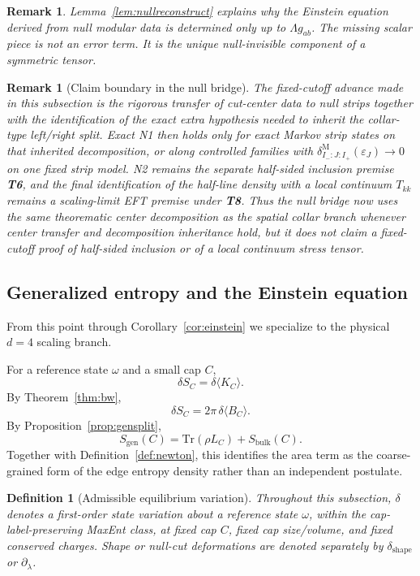 \documentclass[11pt]{article}
\newtheorem{definition}[theorem]{Definition}
\newtheorem{remark}[theorem]{Remark}
\begin{document}
\begin{remark}
Lemma~\ref{lem:nullreconstruct} explains why the Einstein equation derived from null modular data is determined only up to \(\Lambda g_{ab}\). The missing scalar piece is not an error term. It is the unique null-invisible component of a symmetric tensor.
\end{remark}

\begin{remark}[Claim boundary in the null bridge]
The fixed-cutoff advance made in this subsection is the rigorous transfer of cut-center data to null strips together with the identification of the exact extra hypothesis needed to inherit the collar-type left/right split. Exact N1 then holds only for exact Markov strip states on that inherited decomposition, or along controlled families with \(\delta^{\mathrm M}_{I_-:J:I_+}(\varepsilon_J)\to 0\) on one fixed strip model. N2 remains the separate half-sided inclusion premise \textbf{T6}, and the final identification of the half-line density with a local continuum \(T_{kk}\) remains a scaling-limit EFT premise under \textbf{T8}. Thus the null bridge now uses the same theorematic center decomposition as the spatial collar branch whenever center transfer and decomposition inheritance hold, but it does not claim a fixed-cutoff proof of half-sided inclusion or of a local continuum stress tensor.
\end{remark}
\subsection{Generalized entropy and the Einstein equation}

From this point through Corollary~\ref{cor:einstein} we specialize to the physical $d=4$ scaling branch.

For a reference state $\omega$ and a small cap $C$,
\[
\delta S_C=\delta \langle K_C\rangle.
\]
By Theorem~\ref{thm:bw},
\[
\delta S_C = 2\pi\,\delta\langle B_C\rangle.
\]
\noindent
By Proposition~\ref{prop:gensplit},
\[
S_{\mathrm{gen}}(C)=\mathrm{Tr}(\rho L_C)+S_{\mathrm{bulk}}(C).
\]
Together with Definition~\ref{def:newton}, this identifies the area term as the coarse-grained form of the edge entropy density rather than an independent postulate.

\begin{definition}[Admissible equilibrium variation]
Throughout this subsection, $\delta$ denotes a first-order state variation about a reference state $\omega$, within the cap-label-preserving MaxEnt class, at fixed cap $C$, fixed cap size/volume, and fixed conserved charges. Shape or null-cut deformations are denoted separately by $\delta_{\mathrm{shape}}$ or $\partial_\lambda$.
\end{definition}
\end{document}
